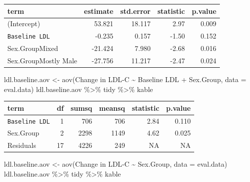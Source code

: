 \documentclass[
]{article}
\newenvironment{Shaded}{\begin{snugshade}}{\end{snugshade}}
\newcommand{\AttributeTok}[1]{\textcolor[rgb]{0.77,0.63,0.00}{#1}}
\newcommand{\FunctionTok}[1]{\textcolor[rgb]{0.00,0.00,0.00}{#1}}
\newcommand{\NormalTok}[1]{#1}
\newcommand{\OtherTok}[1]{\textcolor[rgb]{0.56,0.35,0.01}{#1}}
\newcommand{\SpecialCharTok}[1]{\textcolor[rgb]{0.00,0.00,0.00}{#1}}
\newcommand{\StringTok}[1]{\textcolor[rgb]{0.31,0.60,0.02}{#1}}
\begin{document}
\begin{longtable}[]{@{}lrrrr@{}}
\toprule
term & estimate & std.error & statistic & p.value \\
\midrule
\endhead
(Intercept) & 53.821 & 18.117 & 2.97 & 0.009 \\
\texttt{Baseline\ LDL} & -0.235 & 0.157 & -1.50 & 0.152 \\
Sex.GroupMixed & -21.424 & 7.980 & -2.68 & 0.016 \\
Sex.GroupMostly Male & -27.756 & 11.217 & -2.47 & 0.024 \\
\bottomrule
\end{longtable}

\begin{Shaded}
\begin{Highlighting}[]
\NormalTok{ldl.baseline.aov }\OtherTok{\textless{}{-}} \FunctionTok{aov}\NormalTok{(}\StringTok{\textasciigrave{}}\AttributeTok{Change in LDL{-}C}\StringTok{\textasciigrave{}} \SpecialCharTok{\textasciitilde{}} \StringTok{\textasciigrave{}}\AttributeTok{Baseline LDL}\StringTok{\textasciigrave{}} \SpecialCharTok{+} \StringTok{\textasciigrave{}}\AttributeTok{Sex.Group}\StringTok{\textasciigrave{}}\NormalTok{, }\AttributeTok{data =}\NormalTok{ eval.data)}
\NormalTok{ldl.baseline.aov }\SpecialCharTok{\%\textgreater{}\%}\NormalTok{ tidy }\SpecialCharTok{\%\textgreater{}\%}\NormalTok{ kable}
\end{Highlighting}
\end{Shaded}

\begin{longtable}[]{@{}lrrrrr@{}}
\toprule
term & df & sumsq & meansq & statistic & p.value \\
\midrule
\endhead
\texttt{Baseline\ LDL} & 1 & 706 & 706 & 2.84 & 0.110 \\
Sex.Group & 2 & 2298 & 1149 & 4.62 & 0.025 \\
Residuals & 17 & 4226 & 249 & NA & NA \\
\bottomrule
\end{longtable}

\begin{Shaded}
\begin{Highlighting}[]
\NormalTok{ldl.baseline.aov }\OtherTok{\textless{}{-}} \FunctionTok{aov}\NormalTok{(}\StringTok{\textasciigrave{}}\AttributeTok{Change in LDL{-}C}\StringTok{\textasciigrave{}} \SpecialCharTok{\textasciitilde{}} \StringTok{\textasciigrave{}}\AttributeTok{Sex.Group}\StringTok{\textasciigrave{}}\NormalTok{, }\AttributeTok{data =}\NormalTok{ eval.data)}
\NormalTok{ldl.baseline.aov }\SpecialCharTok{\%\textgreater{}\%}\NormalTok{ tidy }\SpecialCharTok{\%\textgreater{}\%}\NormalTok{ kable}
\end{Highlighting}
\end{Shaded}
\end{document}
